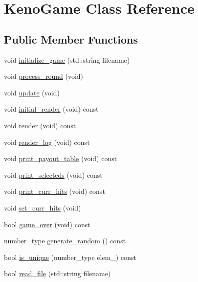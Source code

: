 \hypertarget{classKenoGame}{}\section{Keno\+Game Class Reference}
\label{classKenoGame}
\subsection*{Public Member Functions}
\begin{DoxyCompactItemize}
\item 
void \hyperlink{classKenoGame_a64877ba25ad18afea7677c128ae43654}{initialize\+\_\+game} (std\+::string filename)
\item 
void \hyperlink{classKenoGame_a1032bbc52edd52c30098bed5062dcea0}{process\+\_\+round} (void)
\item 
void \hyperlink{classKenoGame_ad9a216d0858618ff0ccf0e9bb23110cd}{update} (void)
\item 
void \hyperlink{classKenoGame_a57847bc61e3415cad29476314234f8b4}{initial\+\_\+render} (void) const 
\item 
void \hyperlink{classKenoGame_aa4023e5b69f88b7a807dc224b9dff5ef}{render} (void) const 
\item 
void \hyperlink{classKenoGame_aed7eac5a9df192e94b493089e2d0b871}{render\+\_\+log} (void) const 
\item 
void \hyperlink{classKenoGame_acaecdc385b318d483884b5e525ac5dbc}{print\+\_\+payout\+\_\+table} (void) const 
\item 
void \hyperlink{classKenoGame_ad801be67754197194c38f4bfcaae07cc}{print\+\_\+selecteds} (void) const 
\item 
void \hyperlink{classKenoGame_a40eccd25feb4cca369e9ed9ee27ea730}{print\+\_\+curr\+\_\+hits} (void) const 
\item 
void \hyperlink{classKenoGame_a6a2926b0deb7e6060a3969be56dca1db}{set\+\_\+curr\+\_\+hits} (void)
\item 
bool \hyperlink{classKenoGame_acff1e1a4e4a9884a48e84d64356893a3}{game\+\_\+over} (void) const 
\item 
number\+\_\+type \hyperlink{classKenoGame_af02fd68f7ea21e06f79f2074537fe2e6}{generate\+\_\+random} () const 
\item 
bool \hyperlink{classKenoGame_a5a4d1a2bffd82ef3656ea6017cd2c07c}{is\+\_\+unique} (number\+\_\+type elem\+\_\+) const 
\item 
bool \hyperlink{classKenoGame_a145c35bcb09cd8159c66154396d588d2}{read\+\_\+file} (std\+::string filename)
\end{DoxyCompactItemize}


